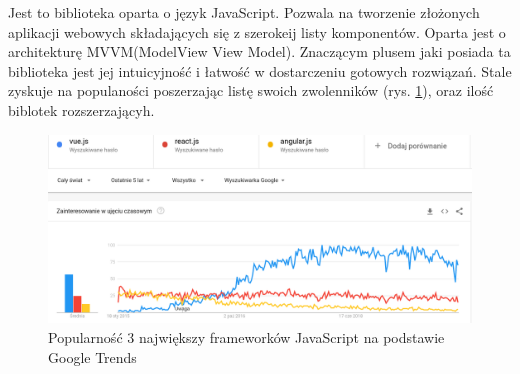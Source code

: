 Jest to biblioteka oparta o język JavaScript. Pozwala na tworzenie złożonych aplikacji webowych składających się z szerokeij listy komponentów.
Oparta jest o architekturę MVVM(ModelView View Model).
Znaczącym plusem jaki posiada ta biblioteka jest jej intuicyjność i łatwość w dostarczeniu gotowych rozwiązań.
Stale zyskuje na populaności poszerzając listę swoich zwolenników (rys. \ref{fig:vue}), oraz ilość biblotek rozszerzającyh.

\begin{figure}[!ht]
    \centering
    \includegraphics[width=6in]{images/vue.png}
    \caption{Popularność 3 największy frameworków JavaScript na podstawie Google Trends \label{fig:vue}}
\end{figure}